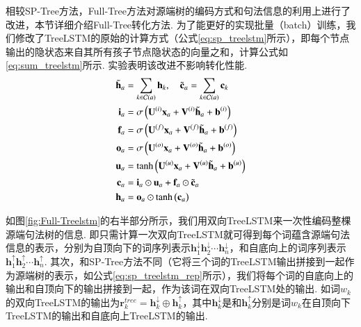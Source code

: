 相较SP-Tree方法，Full-Tree方法对源端树的编码方式和句法信息的利用上进行了改进，本节详细介绍Full-Tree转化方法.
为了能更好的实现批量（batch）训练，我们修改了TreeLSTM的原始的计算方式（公式\ref{eq:sp_treelstm}所示），即每个节点输出的隐状态来自其所有孩子节点隐状态的向量之和，计算公式如\ref{eq:sum_treelstm}所示. 实验表明该改进不影响转化性能.
\begin{equation}
    \label{eq:sum_treelstm}
    \setlength{\abovedisplayskip}{9pt}
    \setlength{\belowdisplayskip}{9pt}
    \begin{split}
        \Tilde{\mathbf{h}}_a &= \sum_{k \in \mathcal{C}(a)} \mathbf{h}_k, \quad \Tilde{\mathbf{c}}_a = \sum_{k \in \mathcal{C}(a)} \mathbf{c}_k \\
        \mathbf{i}_a &= \sigma \left( \mathbf{U}^{(i)} \mathbf{x}_a + \mathbf{V}^{(i)} \Tilde{\mathbf{h}}_a + \mathbf{b}^{(i)} \right) \\
        \mathbf{f}_{a} &= \sigma \left( \mathbf{U}^{(f)} \mathbf{x}_a +  \mathbf{V}^{(f)} \Tilde{\mathbf{h}}_a + \mathbf{b}^{(f)} \right)   \\
        \mathbf{o}_{a} &= \sigma \left( \mathbf{U}^{(o)} \mathbf{x}_a + \mathbf{V}^{(o)} \Tilde{\mathbf{h}}_a + \mathbf{b}^{(o)} \right) \\
        \mathbf{u}_{a} &= \tanh \left( \mathbf{U}^{(u)} \mathbf{x}_a + \mathbf{V}^{(u)} \Tilde{\mathbf{h}}_a + \mathbf{b}^{(u)} \right) \\
        \mathbf{c}_{a} &= \mathbf{i}_a \odot \mathbf{u}_a +  \mathbf{f}_{a} \odot \Tilde{\mathbf{c}}_a \\
        \mathbf{h}_{a} &= \mathbf{o}_a \odot \tanh \big(\mathbf{c}_a\big) \\
    \end{split}
\end{equation}

如图\ref{fig:Full-Treelstm}的右半部分所示，我们用双向TreeLSTM来一次性编码整棵源端句法树的信息. 即只需计算一次双向TreeLSTM就可得到每个词蕴含源端句法信息的表示，分别为自顶向下的词序列表示$\mathbf{h}_1^\downarrow\mathbf{h}_2^\downarrow\cdots \mathbf{h}_n^\downarrow$，和自底向上的词序列表示$\mathbf{h}_1^\uparrow \mathbf{h}_2^\uparrow \cdots \mathbf{h}_n^\uparrow$. 其次，和SP-Tree方法不同（它将三个词的TreeLSTM输出拼接到一起作为源端树的表示，如公式\ref{eq:sp_treelstm_rep}所示），我们将每个词的自底向上的输出和自顶向下的输出拼接到一起，作为该词在双向TreeLSTM处的输出. 如词$w_k$的双向TreeLSTM的输出为$\mathbf{r}_k^{tree} = \mathbf{h}_k^\downarrow \oplus \mathbf{h}_k^\uparrow$，其中$\mathbf{h}_k^\downarrow$是和$\mathbf{h}_k^\uparrow$分别是词$w_k$在自顶向下TreeLSTM的输出和自底向上TreeLSTM的输出.

